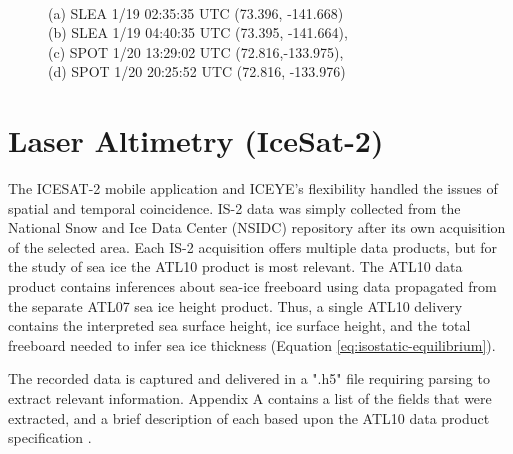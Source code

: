 \begin{figure}[h!]
    \centering
    \caption[ICEYE Captured SAR Imagery]{
    \\\hspace{\textwidth}
    (a) SLEA 1/19 02:35:35 UTC (73.396, -141.668)\\\hspace{\textwidth}
     (b) SLEA 1/19 04:40:35 UTC (73.395, -141.664),\\\hspace{\textwidth}
      (c) SPOT 1/20 13:29:02 UTC (72.816,-133.975),\\\hspace{\textwidth}
      (d) SPOT 1/20 20:25:52 UTC (72.816, -133.976)
      }
    \label{fig:gathered-sar}

\end{figure}

\section {Laser Altimetry (IceSat-2)}
The ICESAT-2 mobile application and ICEYE's flexibility handled the issues of spatial and temporal coincidence. IS-2 data was simply collected from the National Snow and Ice Data Center (NSIDC) repository after its own acquisition of the selected area. Each IS-2 acquisition offers multiple data products, but for the study of sea ice the ATL10 product is most relevant. The ATL10 data product contains inferences about sea-ice freeboard using data propagated from the separate ATL07 sea ice height product. Thus, a single ATL10 delivery contains the interpreted sea surface height, ice surface height, and the total freeboard \cite{ICESat-2-ATL10-Product} needed to infer sea ice thickness (Equation \ref{eq:isostatic-equilibrium}).

The recorded data is captured and delivered in a ".h5" file requiring parsing to extract relevant information. Appendix A contains a list of the fields that were extracted, and a brief description of each based upon the ATL10 data product specification \cite*{ICESat-2-ATL10-Product}.

